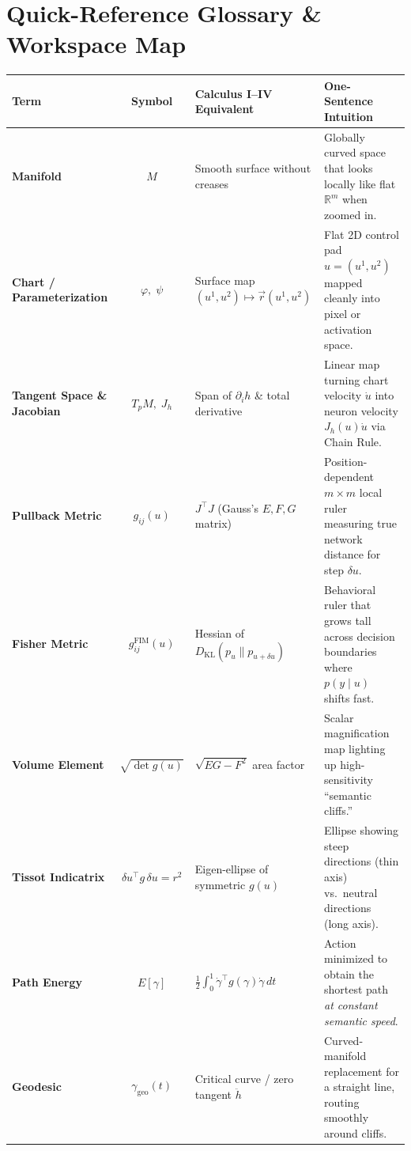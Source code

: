 \documentclass[11pt,a4paper]{article}
\newcommand{\R}{\mathbb{R}}
\newcommand{\DKL}{D_{\mathrm{KL}}}
\theoremstyle{definition}
\begin{document}
\section{Quick-Reference Glossary \& Workspace Map}
\label{sec:glossary}

\begin{table}[ht!]
\centering
\footnotesize
\renewcommand{\arraystretch}{1.32}
\begin{tabularx}{\textwidth}{@{} >{\bfseries}p{} c >{\raggedright\arraybackslash}p{} Y @{}}
\toprule
Term & \textbf{Symbol} & \textbf{Calculus I--IV Equivalent} & \textbf{One-Sentence Intuition} \\
\midrule
Manifold & $M$ & Smooth surface without creases & Globally curved space that looks locally like flat $\R^m$ when zoomed in. \\
Chart / Parameterization & $\varphi,\; \psi$ & Surface map $(u^1, u^2) \mapsto \vec{r}(u^1, u^2)$ & Flat 2D control pad $u = (u^1, u^2)$ mapped cleanly into pixel or activation space. \\
Tangent Space \& Jacobian & $T_p M,\; J_h$ & Span of $\partial_i h$ \& total derivative & Linear map turning chart velocity $\dot{u}$ into neuron velocity $J_h(u)\dot{u}$ via Chain Rule. \\
Pullback Metric & $g_{ij}(u)$ & $J^\top J$ (Gauss's $E, F, G$ matrix) & Position-dependent $m\times m$ local ruler measuring true network distance for step $\delta u$. \\
Fisher Metric & $g^{\mathrm{FIM}}_{ij}(u)$ & Hessian of $\DKL(p_u \parallel p_{u+\delta u})$ & Behavioral ruler that grows tall across decision boundaries where $p(y\mid u)$ shifts fast. \\
Volume Element & $\sqrt{\det g(u)}$ & $\sqrt{EG - F^2}$ area factor & Scalar magnification map lighting up high-sensitivity ``semantic cliffs.'' \\
Tissot Indicatrix & $\delta u^\top g\,\delta u = r^2$ & Eigen-ellipse of symmetric $g(u)$ & Ellipse showing steep directions (thin axis) vs.\ neutral directions (long axis). \\
Path Energy & $E[\gamma]$ & $\frac{1}{2}\int_0^1 \dot{\gamma}^\top g(\gamma)\dot{\gamma}\,dt$ & Action minimized to obtain the shortest path \emph{at constant semantic speed}. \\
Geodesic & $\gamma_{\mathrm{geo}}(t)$ & Critical curve / zero tangent $\ddot{h}$ & Curved-manifold replacement for a straight line, routing smoothly around cliffs. \\

\end{tabularx}
\end{table}
\end{document}
